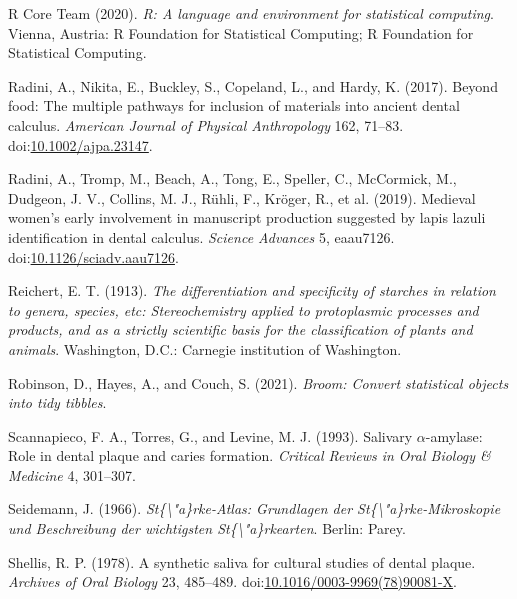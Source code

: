 \documentclass[utf8]{frontiers/frontiersSCNS}
\newlength{\cslhangindent}
\newlength{\cslentryspacingunit} %
\newenvironment{CSLReferences}[2] %
 {%
  \setlength{\parindent}{0pt}
  \ifodd #1
  \let\oldpar\par
  \def\par{\hangindent=\cslhangindent\oldpar}
  \fi
  \setlength{\parskip}{#2\cslentryspacingunit}
 }%
 {}
\begin{document}
\begin{CSLReferences}{1}{0}
\leavevmode{}%
R Core Team (2020). \emph{R: {A} language and environment for statistical computing}. {Vienna, Austria}: {R Foundation for Statistical Computing}; {R Foundation for Statistical Computing}.

\leavevmode{}%
Radini, A., Nikita, E., Buckley, S., Copeland, L., and Hardy, K. (2017). Beyond food: {The} multiple pathways for inclusion of materials into ancient dental calculus. \emph{American Journal of Physical Anthropology} 162, 71--83. doi:\href{https://doi.org/10.1002/ajpa.23147}{10.1002/ajpa.23147}.

\leavevmode{}%
Radini, A., Tromp, M., Beach, A., Tong, E., Speller, C., McCormick, M., Dudgeon, J. V., Collins, M. J., Rühli, F., Kröger, R., et al. (2019). Medieval women's early involvement in manuscript production suggested by lapis lazuli identification in dental calculus. \emph{Science Advances} 5, eaau7126. doi:\href{https://doi.org/10.1126/sciadv.aau7126}{10.1126/sciadv.aau7126}.

\leavevmode{}%
Reichert, E. T. (1913). \emph{The differentiation and specificity of starches in relation to genera, species, etc: Stereochemistry applied to protoplasmic processes and products, and as a strictly scientific basis for the classification of plants and animals}. {Washington, D.C.}: {Carnegie institution of Washington}.

\leavevmode{}%
Robinson, D., Hayes, A., and Couch, S. (2021). \emph{Broom: {Convert} statistical objects into tidy tibbles}.

\leavevmode{}%
Scannapieco, F. A., Torres, G., and Levine, M. J. (1993). Salivary {\(\alpha\)}-amylase: Role in dental plaque and caries formation. \emph{Critical Reviews in Oral Biology \& Medicine} 4, 301--307.

\leavevmode{}%
Seidemann, J. (1966). \emph{St\{\textbackslash"a\}rke-{Atlas}: {Grundlagen} der {St}\{\textbackslash"a\}rke-{Mikroskopie} und {Beschreibung} der wichtigsten {St}\{\textbackslash"a\}rkearten}. {Berlin}: {Parey}.

\leavevmode{}%
Shellis, R. P. (1978). A synthetic saliva for cultural studies of dental plaque. \emph{Archives of Oral Biology} 23, 485--489. doi:\href{https://doi.org/10.1016/0003-9969(78)90081-X}{10.1016/0003-9969(78)90081-X}.


\end{CSLReferences}
\end{document}
